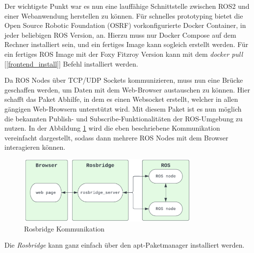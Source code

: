 \begin{flushleft}

Der wichtigste Punkt war es nun eine lauffähige Schnittstelle zwischen ROS2 und einer Webanwendung herstellen zu können.
Für schnelles prototyping bietet die Open Source Robotic Foundation (OSRF) vorkonfigurierte Docker Container, in jeder beliebigen ROS Version, an.
Hierzu muss nur Docker Compose auf dem Rechner installiert sein, und ein fertiges Image kann sogleich erstellt werden.
Für ein fertiges ROS Image mit der Foxy Fitzroy Version kann mit dem \textit{docker pull} [\ref{frontend_install}] Befehl installiert werden. 


Da ROS Nodes über TCP/UDP Sockets kommunizieren, muss nun eine Brücke geschaffen werden, um Daten mit dem Web-Browser austauschen zu können.
Hier schafft das \cite[Rosbridge]{rosbridgepackage} Paket Abhilfe, in dem es einen Websocket erstellt, welcher in allen gängigen Web-Browsern unterstützt wird. Mit diesem Paket ist es nun möglich die bekannten Publish- und Subscribe-Funktionalitäten der ROS-Umgebung zu nutzen.
In der Abbildung \ref{fig:rosbridge_chain} wird die eben beschriebene Kommunikation vereinfacht dargestellt, sodass dann mehrere ROS Nodes mit dem Browser interagieren können.
\begin{figure}[h!]
    \centering
    \includegraphics[width=0.8\textwidth]{imgs/web/rosbridge_chain.png}
    \caption{Rosbridge Kommunikation \cite{foxyglove_rosbridge_tut}}
    \label{fig:rosbridge_chain}%
\end{figure}
Die \textit{Rosbridge} kann ganz einfach über den apt-Paketmanager installiert werden.




\end{flushleft}
